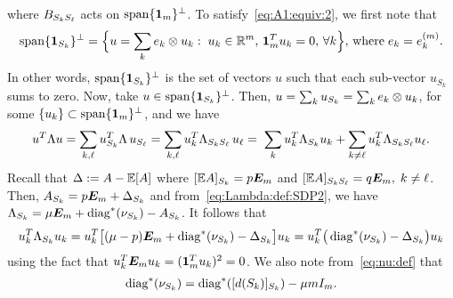 where $B_{S_{k}S_{\ell}}$ acts on $\operatorname{span}\{\bm{1}_m\}^\perp$. 
To satisfy~\eqref{eq:A1:equiv:2}, we first note that
\begin{align*}
  \operatorname{span}\{\bm{1}_{S_k}\}^\perp = 
  \Big\{ u = \sum_k e_k \otimes u_k:\; u_k \in \mathbb{R}^m, \, \bm{1}_m^T u_k = 0, \, \forall k\Big\}, 
  \, \text{where}\; e_k = e_k^{(m)}.
\end{align*}
In other words, $\operatorname{span}\{\bm{1}_{S_k}\}^\perp$ is the set of vectors $u$ such that each sub-vector $u_{S_k}$ sums to zero. Now, take $u \in \operatorname{span}\{\bm{1}_{S_k}\}^\perp$. Then, $u = \sum_k u_{S_{k}} = \sum_k e_k \otimes u_k$, for some $\{u_k\} \subset \operatorname{span}\{\bm{1}_m\}^\perp$, and we have
  \begin{align}\label{eq:u:Lambda:u:expan}
    u^T \Lambda u = \sum_{k,\ell} u_{S_{k}}^T \Lambda \,u_{S_{\ell}} = 
    \sum_{k,\ell} u_k^T \Lambda_{S_{k}S_{\ell}} \,u_\ell =\; 
    \sum_{k} u_k^T \Lambda_{S_{k}} u_k + 
    \sum_{k\neq \ell} u_k^T \Lambda_{S_{k}S_{\ell}} u_\ell.
  \end{align}
Recall that $\Delta := A - \mathbb{E}[A]$ where $[\mathbb{E} A]_{S_{k}} = p \bm{E}_m$ and $[\mathbb{E} A]_{S_{k}S_{\ell}} = q\bm{E}_m, \; k \neq \ell$.
  Then, $A_{S_{k}} = p \bm{E}_m + \Delta_{S_{k}}$ and from~\eqref{eq:Lambda:def:SDP2}, we have $\Lambda_{S_{k}} =  \mu \bm{E}_m + \operatorname{diag}^*(\nu_{S_{k}}) - A_{S_{k}}$. It follows that
  \begin{align*}
    u_k^T \Lambda_{S_{k}} u_k 
      = u_k^T\big[(\mu -p) \bm{E}_m + \operatorname{diag}^*(\nu_{S_{k}}) - \Delta_{S_{k}} \big] u_k 
      = u_k^T\big( \operatorname{diag}^*(\nu_{S_{k}}) - \Delta_{S_{k}} \big) u_k 
  \end{align*}
  using the fact that $u_k^T \bm{E}_m u_k = (\bm{1}_m^T u_k)^2 = 0$. We also note from~\eqref{eq:nu:def} that
  \begin{align*}
    \operatorname{diag}^*(\nu_{S_{k}}) = \operatorname{diag}^*([d(S_{k})]_{S_{k}}) - \mu m I_m.
  \end{align*}

